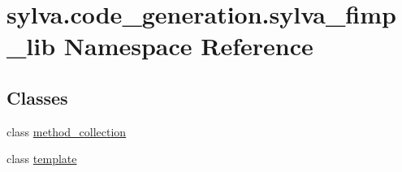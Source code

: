 \hypertarget{namespacesylva_1_1code__generation_1_1sylva__fimp__lib}{}\section{sylva.\+code\+\_\+generation.\+sylva\+\_\+fimp\+\_\+lib Namespace Reference}
\label{namespacesylva_1_1code__generation_1_1sylva__fimp__lib}
\subsection*{Classes}
\begin{DoxyCompactItemize}
\item 
class \hyperlink{classsylva_1_1code__generation_1_1sylva__fimp__lib_1_1method__collection}{method\+\_\+collection}
\item 
class \hyperlink{classsylva_1_1code__generation_1_1sylva__fimp__lib_1_1template}{template}
\end{DoxyCompactItemize}
